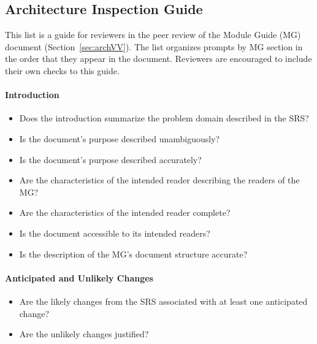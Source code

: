 \subsection{Architecture Inspection Guide}\label{appendix:archInspection}
This list is a guide for reviewers in the peer review of the Module Guide (MG)
document (Section~\ref{sec:archVV}). The list organizes prompts by MG section
in the order that they appear in the document. Reviewers are encouraged to
include their own checks to this guide.

\paragraph{Introduction}
\begin{itemize}

    \item Does the introduction summarize the problem domain described in the
    SRS?

    \item Is the document's purpose described unambiguously?

    \item Is the document's purpose described accurately?

    \item Are the characteristics of the intended reader describing the readers
    of the MG?

    \item Are the characteristics of the intended reader complete?

    \item Is the document accessible to its intended readers?

    \item Is the description of the MG's document structure accurate?

\end{itemize}

\paragraph{Anticipated and Unlikely Changes}
\begin{itemize}

    \item Are the likely changes from the SRS associated with at least one
    anticipated change?

    \item Are the unlikely changes justified?

\end{itemize}

